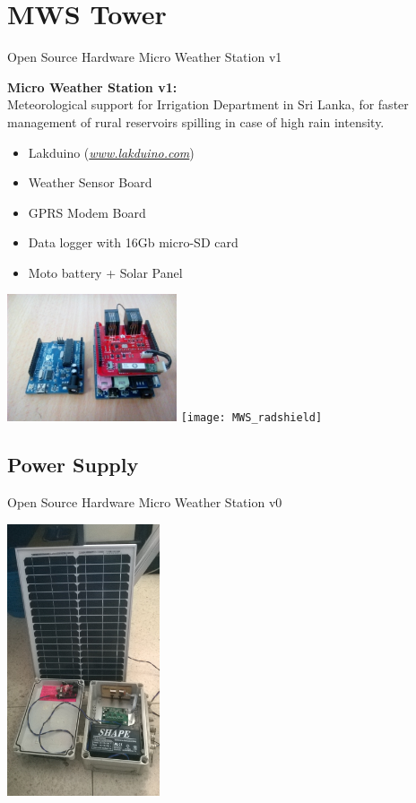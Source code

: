 \documentclass[xcolor=dvipsnames,beamer,unknownkeysallowed]{beamer} %
\begin{document}
\section{ MWS Tower}
\begin{frame}[fragile]{Open Source Hardware Micro Weather Station v1}

\textbf{Micro Weather Station v1:}\\
Meteorological support for Irrigation Department in Sri Lanka, for faster management of rural reservoirs spilling in case of high rain intensity.
\vspace{5mm}
\begin{itemize}
 \item Lakduino (\href{www.lakduino.com}{\textit{www.lakduino.com}})
 \item Weather Sensor Board
 \item GPRS Modem Board
 \item Data logger with 16Gb micro-SD card
 \item Moto battery + Solar Panel
\end{itemize}
\begin{flushright}
  \includegraphics[width=5cm]{MWSv1}
  \hspace{5mm}
  \texttt{[image: MWS\_radshield]}
\end{flushright}
\end{frame}

\subsection{Power Supply}
\begin{frame}[fragile]{Open Source Hardware Micro Weather Station v0}

\begin{center}
\includegraphics[width=4.5cm]{MWSv1_power}
\end{center}
\end{frame}
\end{document}
